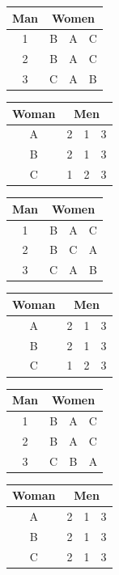 \documentclass[11pt]{article}
\begin{document}
\begin{qunlist}
\begin{itemize}
{\begin{center}
\begin{tabular}{|c|ccc|}\hline 
Man&\multicolumn{3}{|c|}{Women}\\\hline 
1&B&A&C\\\hline 
2&B&A&C\\\hline 
3&C&A&B\\\hline
\end{tabular} 
\hspace{2cm}
\begin{tabular}{|c|ccc|}\hline 
Woman&\multicolumn{3}{|c|}{Men}\\\hline 
A&2&1&3\\\hline 
B&2&1&3\\\hline 
C&1&2&3\\\hline
\end{tabular}
\end{center}

\begin{center}
\begin{tabular}{|c|ccc|}\hline 
Man&\multicolumn{3}{|c|}{Women}\\\hline 
1&B&A&C\\\hline 
2&B&C&A\\\hline 
3&C&A&B\\\hline
\end{tabular} 
\hspace{2cm}
\begin{tabular}{|c|ccc|}\hline 
Woman&\multicolumn{3}{|c|}{Men}\\\hline 
A&2&1&3\\\hline 
B&2&1&3\\\hline 
C&1&2&3\\\hline
\end{tabular}
\end{center}

\begin{center}
\begin{tabular}{|c|ccc|}\hline 
Man&\multicolumn{3}{|c|}{Women}\\\hline 
1&B&A&C\\\hline 
2&B&A&C\\\hline 
3&C&B&A\\\hline
\end{tabular} 
\hspace{2cm}
\begin{tabular}{|c|ccc|}\hline 
Woman&\multicolumn{3}{|c|}{Men}\\\hline 
A&2&1&3\\\hline 
B&2&1&3\\\hline 
C&2&1&3\\\hline
\end{tabular}
\end{center}

}
\end{itemize}
\end{qunlist}
\end{document}
